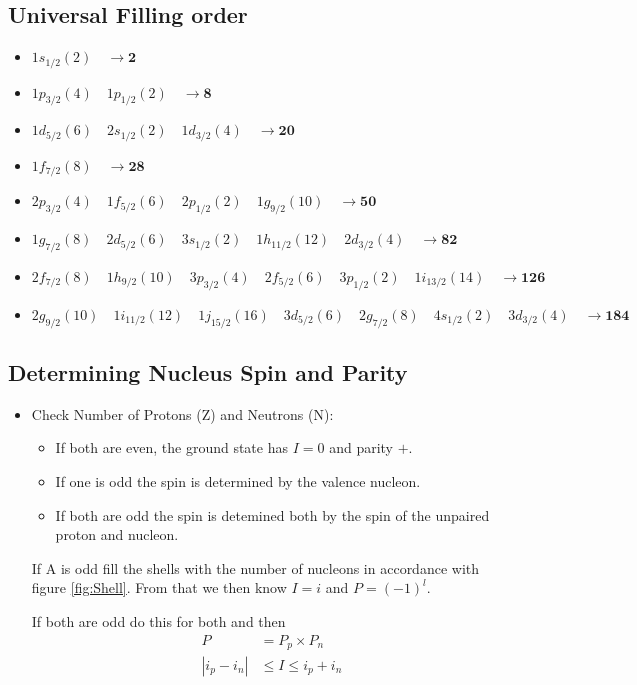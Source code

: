 \documentclass[a4paper,oneside,article]{memoir}
\begin{document}
\subsection{Universal Filling order}
\begin{itemize}
  \item $1s_{1/2} (2) \quad \rightarrow \mathbf{2}$
  \item $1p_{3/2} (4) \quad 1p_{1/2} (2) \quad \rightarrow \mathbf{8}$
  \item $1d_{5/2} (6) \quad 2s_{1/2} (2) \quad 1d_{3/2} (4) \quad \rightarrow \mathbf{2 0}$
  \item $1f_{7/2} (8) \quad \rightarrow \mathbf{2 8} $
  \item $2p_{3/2} (4) \quad 1f_{5/2} (6) \quad 2p_{1/2} (2) \quad 1g_{9/2} (10) \quad \rightarrow \mathbf{5 0}$
  \item $1g_{7/2} (8) \quad 2d_{5/2} (6) \quad 3s_{1/2} (2) \quad 1h_{11/2} (12) \quad 2d_{3/2} (4) \quad \rightarrow \mathbf{8 2}$
  \item $ 2f_{7/2} (8) \quad 1h_{9/2} (10) \quad 3p_{3/2} (4) \quad 2f_{5/2} (6) \quad 3p_{1/2} (2) \quad 1i_{13/2} (14) \quad \rightarrow \mathbf{1 2 6}$
  \item $2g_{9/2} (10) \quad 1i_{11/2} (12) \quad 1j_{15/2} (16) \quad 3d_{5/2} (6) \quad 2g_{7/2} (8) \quad 4s_{1/2} (2) \quad 3d_{3/2} (4) \quad \rightarrow \mathbf{1 8 4}$
\end{itemize}

\subsection{Determining Nucleus Spin and Parity}
\begin{itemize}
  \item Check Number of Protons (Z) and Neutrons (N):
  \begin{itemize}
    \item If both are even, the ground state has $I=0$ and parity $+$. 
    \item If one is odd the spin is determined by the valence nucleon. 
    \item If both are odd the spin is detemined both by the spin of the unpaired proton and nucleon. 
  \end{itemize}
  If A is odd fill the shells with the number of nucleons in accordance with figure \ref{fig:Shell}.
  From that we then know $I=i$ and $P=(-1)^l$. 

  If both are odd do this for both and then 
  \begin{align*}
    P &= P_p \times P_n \\
    |i_p-i_n| &\leq I \leq i_p + i_n
  \end{align*}
\end{itemize}
\end{document}
